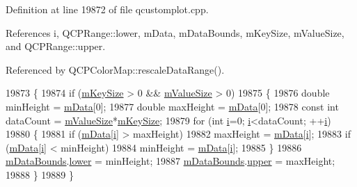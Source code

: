Definition at line 19872 of file qcustomplot.\+cpp.



References i, Q\+C\+P\+Range\+::lower, m\+Data, m\+Data\+Bounds, m\+Key\+Size, m\+Value\+Size, and Q\+C\+P\+Range\+::upper.



Referenced by Q\+C\+P\+Color\+Map\+::rescale\+Data\+Range().


\begin{DoxyCode}
19873 \{
19874   \textcolor{keywordflow}{if} (\hyperlink{class_q_c_p_color_map_data_a354e06462023340fbc03894b22499f6d}{mKeySize} > 0 && \hyperlink{class_q_c_p_color_map_data_ae8ee9093632a59f55eb4fc06579ed256}{mValueSize} > 0)
19875   \{
19876     \textcolor{keywordtype}{double} minHeight = \hyperlink{class_q_c_p_color_map_data_ac1682862022f575191351c9825187d39}{mData}[0];
19877     \textcolor{keywordtype}{double} maxHeight = \hyperlink{class_q_c_p_color_map_data_ac1682862022f575191351c9825187d39}{mData}[0];
19878     \textcolor{keyword}{const} \textcolor{keywordtype}{int} dataCount = \hyperlink{class_q_c_p_color_map_data_ae8ee9093632a59f55eb4fc06579ed256}{mValueSize}*\hyperlink{class_q_c_p_color_map_data_a354e06462023340fbc03894b22499f6d}{mKeySize};
19879     \textcolor{keywordflow}{for} (\textcolor{keywordtype}{int} \hyperlink{_comparision_pictures_2_createtest_image_8m_a6f6ccfcf58b31cb6412107d9d5281426}{i}=0; \hyperlink{_comparision_pictures_2_createtest_image_8m_a6f6ccfcf58b31cb6412107d9d5281426}{i}<dataCount; ++\hyperlink{_comparision_pictures_2_createtest_image_8m_a6f6ccfcf58b31cb6412107d9d5281426}{i})
19880     \{
19881       \textcolor{keywordflow}{if} (\hyperlink{class_q_c_p_color_map_data_ac1682862022f575191351c9825187d39}{mData}[\hyperlink{_comparision_pictures_2_createtest_image_8m_a6f6ccfcf58b31cb6412107d9d5281426}{i}] > maxHeight)
19882         maxHeight = \hyperlink{class_q_c_p_color_map_data_ac1682862022f575191351c9825187d39}{mData}[\hyperlink{_comparision_pictures_2_createtest_image_8m_a6f6ccfcf58b31cb6412107d9d5281426}{i}];
19883       \textcolor{keywordflow}{if} (\hyperlink{class_q_c_p_color_map_data_ac1682862022f575191351c9825187d39}{mData}[\hyperlink{_comparision_pictures_2_createtest_image_8m_a6f6ccfcf58b31cb6412107d9d5281426}{i}] < minHeight)
19884         minHeight = \hyperlink{class_q_c_p_color_map_data_ac1682862022f575191351c9825187d39}{mData}[\hyperlink{_comparision_pictures_2_createtest_image_8m_a6f6ccfcf58b31cb6412107d9d5281426}{i}];
19885     \}
19886     \hyperlink{class_q_c_p_color_map_data_a1798b3dcc0a27091d196bfd156dcb3f2}{mDataBounds}.\hyperlink{class_q_c_p_range_aa3aca3edb14f7ca0c85d912647b91745}{lower} = minHeight;
19887     \hyperlink{class_q_c_p_color_map_data_a1798b3dcc0a27091d196bfd156dcb3f2}{mDataBounds}.\hyperlink{class_q_c_p_range_ae44eb3aafe1d0e2ed34b499b6d2e074f}{upper} = maxHeight;
19888   \}
19889 \}
\end{DoxyCode}


